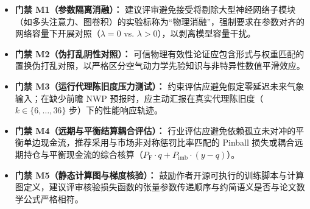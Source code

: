 \begin{itemize}
\item \textbf{门禁 M1（参数隔离消融）：} 建议评审避免接受将剔除大型神经网络子模块（如多头注意力、图卷积）的实验标称为“物理消融”，强制要求在参数对齐的网络容量下开展对照（$\lambda=0$ vs. $\lambda>0$），以剥离模型容量干扰。
\item \textbf{门禁 M2（伪打乱阴性对照）：} 可信物理有效性论证应包含形式与权重匹配的置换伪打乱对照，以严格区分空气动力学先验知识与非特异性数值平滑效应。
\item \textbf{门禁 M3（运行代理陈旧度压力测试）：} 约束评估应避免假定零延迟未来气象输入；在缺少前瞻 NWP 预报时，应主动汇报在真实代理陈旧度（$k \in \{6, \dots, 36\}$ 步）下的性能响应轨迹。
\item \textbf{门禁 M4（远期与平衡结算耦合评估）：} 行业评估应避免依赖孤立未对冲的平衡单边现金流，推荐采用与市场非对称惩罚比率匹配的 Pinball 损失或耦合远期持仓与平衡现金流的综合核算（$P_{\text{F}} \cdot q + P_{\text{imb}} \cdot (y - q)$）。
\item \textbf{门禁 M5（静态计算图与梯度核验）：} 鼓励作者开源可执行的训练脚本与计算图定义，建议评审核验损失函数的张量参数传递顺序与约简语义是否与论文数学公式严格相符。
\end{itemize}
